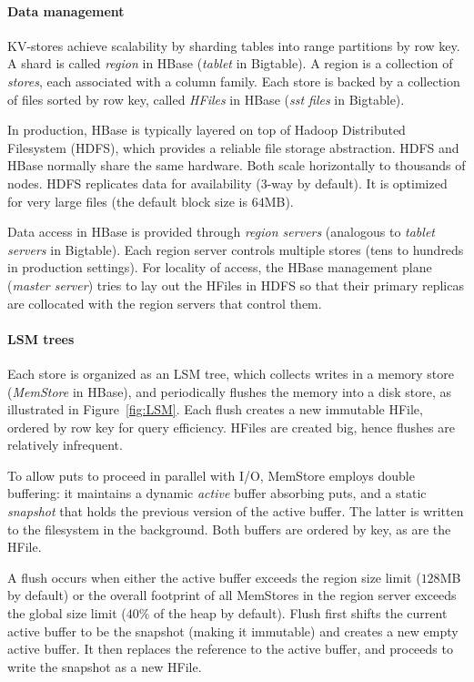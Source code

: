 \paragraph{Data management}
KV-stores achieve scalability by sharding tables into range partitions by row key. 
A shard is called {\em region\/} in HBase (\emph{tablet} in Bigtable). 
A region is a collection of \emph{stores}, each associated with a column family. 
Each store is backed by a collection of files sorted by row key, called \emph{HFiles} in HBase 
(\emph{sst files} in Bigtable). 

In production, HBase is typically layered on top of Hadoop Distributed Filesystem (HDFS), 
which provides a reliable file storage abstraction. HDFS and HBase normally share the same hardware. 
Both scale horizontally to thousands of nodes. HDFS replicates data for availability (3-way by default). 
It is optimized for very large files (the default block size is $64$MB).

Data access in HBase is provided through {\em region servers} (analogous to {\em tablet servers}
in Bigtable). Each region server controls multiple stores (tens to hundreds in production settings). 
For locality of access, the HBase management plane (\emph{master server}) tries to lay out the 
HFiles in HDFS so that their primary replicas are collocated with the region servers that control them. 

\paragraph{LSM trees}
Each store is organized as an LSM tree, which collects writes in a memory store 
(\emph{MemStore} in HBase), and periodically flushes the memory into a disk store, as illustrated in 
Figure~\ref{fig:LSM}. Each flush creates a new immutable HFile, ordered by row key for query efficiency. 
HFiles are created big, hence flushes are relatively infrequent. 

To allow puts to proceed in parallel with I/O, MemStore employs double buffering:
it maintains a dynamic \emph{active} buffer absorbing puts, and a static \emph{snapshot}
that holds the previous version of the active buffer. The latter is written to the 
filesystem in the background. Both buffers are ordered by key, as are the HFile.  

A flush occurs  when either the active buffer 
exceeds the region size limit ($128$MB by default) or  the overall footprint of all MemStores
in the region server exceeds the global size limit ($40\%$ of the heap by default). 
Flush first shifts the current active buffer to be the snapshot (making it immutable) and creates a new empty active buffer.
It then replaces the reference to the active buffer, and proceeds to write the snapshot as a new HFile. 

